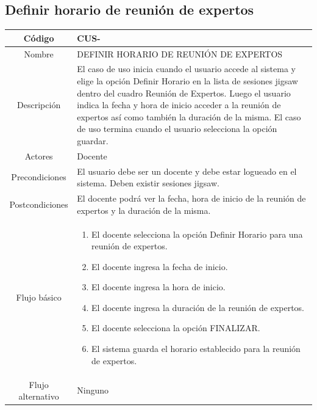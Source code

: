 \subsection{Definir horario de reunión de expertos}
\begin{longtable}{|c|L{10cm}|}
	\hline
	Código &  CUS-\casodeuso\\  \hline
	Nombre &  DEFINIR HORARIO DE REUNIÓN DE EXPERTOS\\  \hline
	Descripción & El caso de uso inicia cuando el usuario accede al sistema y elige la opción Definir Horario en la lista de sesiones jigsaw dentro del cuadro Reunión de Expertos. Luego el usuario indica la fecha y hora de inicio acceder a la reunión de expertos así como también la duración de la misma. El caso de uso termina cuando el usuario selecciona la opción guardar. \\  \hline
	Actores &  Docente\\  \hline
	Precondiciones & El usuario debe ser un docente y debe estar logueado en el sistema. Deben existir sesiones jigsaw. \\  \hline
	Postcondiciones & El docente podrá ver la fecha, hora de inicio de la reunión de expertos y la duración de la misma. \\  \hline
	Flujo básico & \begin{enumerate}
		\item El docente selecciona la opción Definir Horario para una reunión de expertos.
		\item El docente ingresa la fecha de inicio.
		\item El docente ingresa la hora de inicio.
		\item El docente ingresa la duración de la reunión de expertos.
		\item El docente selecciona la opción FINALIZAR.
		\item El sistema guarda el horario establecido para la reunión de expertos.
	\end{enumerate}
	\\  \hline
	Flujo alternativo & Ninguno \\  \hline
\end{longtable}
\clearpage
